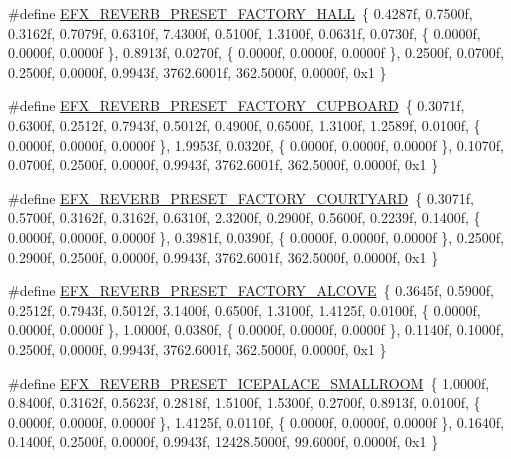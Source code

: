 \begin{DoxyCompactItemize}
\item 
\#define \mbox{\hyperlink{efx-presets_8h_a77f1d495628c3b9943873adc18f5a979}{E\+F\+X\+\_\+\+R\+E\+V\+E\+R\+B\+\_\+\+P\+R\+E\+S\+E\+T\+\_\+\+F\+A\+C\+T\+O\+R\+Y\+\_\+\+H\+A\+LL}}~\{ 0.\+4287f, 0.\+7500f, 0.\+3162f, 0.\+7079f, 0.\+6310f, 7.\+4300f, 0.\+5100f, 1.\+3100f, 0.\+0631f, 0.\+0730f, \{ 0.\+0000f, 0.\+0000f, 0.\+0000f \}, 0.\+8913f, 0.\+0270f, \{ 0.\+0000f, 0.\+0000f, 0.\+0000f \}, 0.\+2500f, 0.\+0700f, 0.\+2500f, 0.\+0000f, 0.\+9943f, 3762.\+6001f, 362.\+5000f, 0.\+0000f, 0x1 \}
\item 
\#define \mbox{\hyperlink{efx-presets_8h_a92403add280fb6a386b7c72ad1a39d32}{E\+F\+X\+\_\+\+R\+E\+V\+E\+R\+B\+\_\+\+P\+R\+E\+S\+E\+T\+\_\+\+F\+A\+C\+T\+O\+R\+Y\+\_\+\+C\+U\+P\+B\+O\+A\+RD}}~\{ 0.\+3071f, 0.\+6300f, 0.\+2512f, 0.\+7943f, 0.\+5012f, 0.\+4900f, 0.\+6500f, 1.\+3100f, 1.\+2589f, 0.\+0100f, \{ 0.\+0000f, 0.\+0000f, 0.\+0000f \}, 1.\+9953f, 0.\+0320f, \{ 0.\+0000f, 0.\+0000f, 0.\+0000f \}, 0.\+1070f, 0.\+0700f, 0.\+2500f, 0.\+0000f, 0.\+9943f, 3762.\+6001f, 362.\+5000f, 0.\+0000f, 0x1 \}
\item 
\#define \mbox{\hyperlink{efx-presets_8h_a687a7fe2f8084947684e61917343ac38}{E\+F\+X\+\_\+\+R\+E\+V\+E\+R\+B\+\_\+\+P\+R\+E\+S\+E\+T\+\_\+\+F\+A\+C\+T\+O\+R\+Y\+\_\+\+C\+O\+U\+R\+T\+Y\+A\+RD}}~\{ 0.\+3071f, 0.\+5700f, 0.\+3162f, 0.\+3162f, 0.\+6310f, 2.\+3200f, 0.\+2900f, 0.\+5600f, 0.\+2239f, 0.\+1400f, \{ 0.\+0000f, 0.\+0000f, 0.\+0000f \}, 0.\+3981f, 0.\+0390f, \{ 0.\+0000f, 0.\+0000f, 0.\+0000f \}, 0.\+2500f, 0.\+2900f, 0.\+2500f, 0.\+0000f, 0.\+9943f, 3762.\+6001f, 362.\+5000f, 0.\+0000f, 0x1 \}
\item 
\#define \mbox{\hyperlink{efx-presets_8h_a20efe3830ae7142d45be73af807e4d04}{E\+F\+X\+\_\+\+R\+E\+V\+E\+R\+B\+\_\+\+P\+R\+E\+S\+E\+T\+\_\+\+F\+A\+C\+T\+O\+R\+Y\+\_\+\+A\+L\+C\+O\+VE}}~\{ 0.\+3645f, 0.\+5900f, 0.\+2512f, 0.\+7943f, 0.\+5012f, 3.\+1400f, 0.\+6500f, 1.\+3100f, 1.\+4125f, 0.\+0100f, \{ 0.\+0000f, 0.\+0000f, 0.\+0000f \}, 1.\+0000f, 0.\+0380f, \{ 0.\+0000f, 0.\+0000f, 0.\+0000f \}, 0.\+1140f, 0.\+1000f, 0.\+2500f, 0.\+0000f, 0.\+9943f, 3762.\+6001f, 362.\+5000f, 0.\+0000f, 0x1 \}
\item 
\#define \mbox{\hyperlink{efx-presets_8h_a5873e650095207f32ba5618d48a17aa5}{E\+F\+X\+\_\+\+R\+E\+V\+E\+R\+B\+\_\+\+P\+R\+E\+S\+E\+T\+\_\+\+I\+C\+E\+P\+A\+L\+A\+C\+E\+\_\+\+S\+M\+A\+L\+L\+R\+O\+OM}}~\{ 1.\+0000f, 0.\+8400f, 0.\+3162f, 0.\+5623f, 0.\+2818f, 1.\+5100f, 1.\+5300f, 0.\+2700f, 0.\+8913f, 0.\+0100f, \{ 0.\+0000f, 0.\+0000f, 0.\+0000f \}, 1.\+4125f, 0.\+0110f, \{ 0.\+0000f, 0.\+0000f, 0.\+0000f \}, 0.\+1640f, 0.\+1400f, 0.\+2500f, 0.\+0000f, 0.\+9943f, 12428.\+5000f, 99.\+6000f, 0.\+0000f, 0x1 \}

\end{DoxyCompactItemize}
